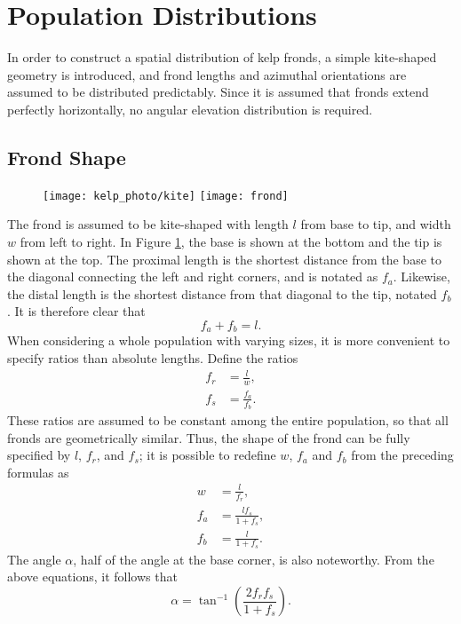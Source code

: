 \section{Population Distributions}
In order to construct a spatial distribution of kelp fronds, a simple kite-shaped geometry is introduced,
and frond lengths and azimuthal orientations are assumed to be distributed predictably.
Since it is assumed that fronds extend perfectly horizontally, no angular elevation distribution is required.

\subsection{Frond Shape}
\label{sec:shape}

\begin{figure}[h]
	\centering
  \texttt{[image: kelp\_photo/kite]}
  \qquad
	\texttt{[image: frond]}
	\label{fig:frond}
\end{figure}

The frond is assumed to be kite-shaped with length $l$ from base to tip, and width $w$ from left to right.
In Figure \ref{fig:frond}, the base is shown at the bottom and the tip is shown at the top.
The proximal length is the shortest distance from the base to the diagonal connecting the left and right corners, and is notated as $f_a$.
Likewise, the distal length is the shortest distance from that diagonal to the tip, notated $f_b$.
It is therefore clear that
 \begin{equation*}
	 f_a + f_b = l.
 \end{equation*}
When considering a whole population with varying sizes, it is more convenient to specify ratios than absolute lengths.
Define the ratios
\begin{align*}
	f_r &= \frac{l}{w}, \\
	f_s &= \frac{f_a}{f_b}.
\end{align*}
These ratios are assumed to be constant among the entire population, so that all fronds are geometrically similar.
Thus, the shape of the frond can be fully specified by $l$, $f_r$, and $f_s$;
it is possible to redefine $w$, $f_a$ and $f_b$ from the preceding formulas as
\begin{align*}
	w &= \frac{l}{f_r}, \\
	f_a &= \frac{lf_s}{1+f_s}, \\
	f_b &= \frac{l}{1+f_s}.
\end{align*}
The angle $\alpha$, half of the angle at the base corner, is also noteworthy.
From the above equations, it follows that
\begin{equation*}
	\alpha = \tan^{-1}\left(\frac{2f_rf_s}{1+f_s}\right).
\end{equation*}

